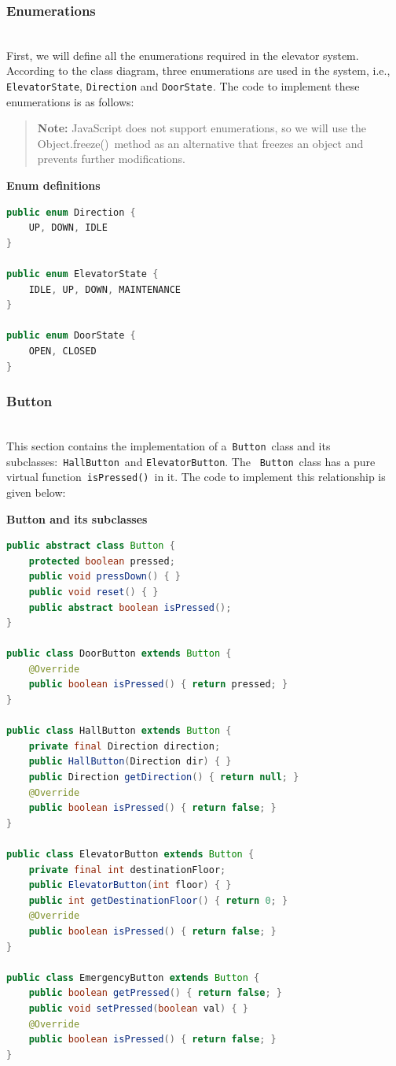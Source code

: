 \subsubsection{Enumerations}\label{4BVN4mMZA3hlD0epKFUXP}
\\
First, we will define all the enumerations required in the elevator system. According to the class diagram, three enumerations are used in the system, i.e., \texttt{ElevatorState}, \texttt{Direction} and \texttt{DoorState}\emph{.} The code to implement these enumerations is as follows:
\begin{quote}
\textbf{Note:} JavaScript does not support enumerations, so we will use the Object.freeze()\ method as an alternative that freezes an object and prevents further modifications.
\end{quote}

\textbf{Enum definitions}

\begin{lstlisting}[language=Java]
public enum Direction {
    UP, DOWN, IDLE
}

public enum ElevatorState {
    IDLE, UP, DOWN, MAINTENANCE
}

public enum DoorState {
    OPEN, CLOSED
}

\end{lstlisting}

\subsubsection{Button}\label{RWXA6Mmrdlki4DsobSWvj}
\\
This section contains the implementation of a~\texttt{Button}~class and its subclasses:~\texttt{HallButton}~and \texttt{ElevatorButton}. The ~\texttt{Button}~class has a pure virtual function~\texttt{isPressed()}~in it. The code to implement this relationship is given below:

\textbf{Button and its subclasses}

\begin{lstlisting}[language=Java]
public abstract class Button {
    protected boolean pressed;
    public void pressDown() { }
    public void reset() { }
    public abstract boolean isPressed();
}

public class DoorButton extends Button {
    @Override
    public boolean isPressed() { return pressed; }
}

public class HallButton extends Button {
    private final Direction direction;
    public HallButton(Direction dir) { }
    public Direction getDirection() { return null; }
    @Override
    public boolean isPressed() { return false; }
}

public class ElevatorButton extends Button {
    private final int destinationFloor;
    public ElevatorButton(int floor) { }
    public int getDestinationFloor() { return 0; }
    @Override
    public boolean isPressed() { return false; }
}

public class EmergencyButton extends Button {
    public boolean getPressed() { return false; }
    public void setPressed(boolean val) { }
    @Override
    public boolean isPressed() { return false; }
}
\end{lstlisting}

